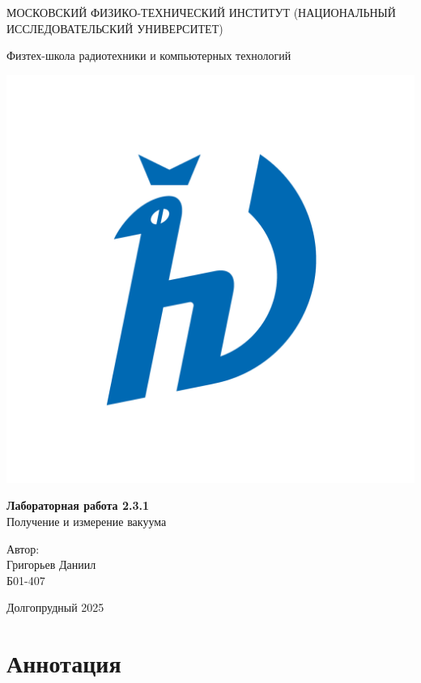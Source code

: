 \documentclass[a4paper,12pt]{article}
\begin{document}
\begin{titlepage}
\begin{center}
    {\large МОСКОВСКИЙ ФИЗИКО-ТЕХНИЧЕСКИЙ ИНСТИТУТ (НАЦИОНАЛЬНЫЙ ИССЛЕДОВАТЕЛЬСКИЙ УНИВЕРСИТЕТ)}
\end{center}

\begin{center}
    {\large Физтех-школа радиотехники и компьютерных технологий}
\end{center}

\vspace{3.5cm}

\begin{center}
    \includegraphics[width=0.4\linewidth]{img/hv_full.png}
\end{center}

\vspace{0.1cm}

{\huge
\begin{center}
    {\bf Лабораторная работа 2.3.1}\\
    Получение и измерение вакуума
\end{center}
}

\vspace{2cm}

\begin{flushright}
{\LARGE Автор:\\ Григорьев Даниил \\
\vspace{0.2cm}
Б01-407}
\end{flushright}

\vspace{3.5cm}
\begin{center}
    Долгопрудный 2025
\end{center}
\end{titlepage}

\section{Аннотация}
\end{document}
